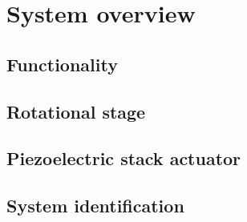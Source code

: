 \chapter{System overview}\label{cha:systemOverview}

\section{Functionality}



\section{Rotational stage}


\section{Piezoelectric stack actuator}

\section{System identification}
